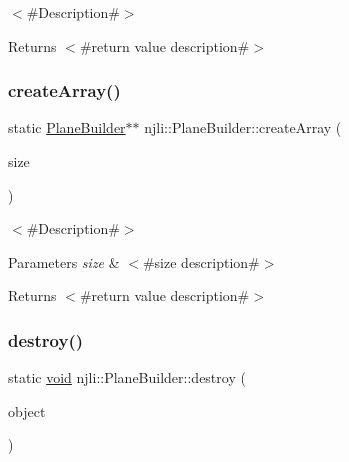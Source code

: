 $<$\#\+Description\#$>$

\begin{DoxyReturn}{Returns}
$<$\#return value description\#$>$ 
\end{DoxyReturn}
\mbox{\label{classnjli_1_1_plane_builder_a8ccda78e11dc743eac59119d6447f629}} 
\subsubsection{\texorpdfstring{create\+Array()}{createArray()}}
{\footnotesize\ttfamily static \mbox{\hyperlink{classnjli_1_1_plane_builder}{Plane\+Builder}}$\ast$$\ast$ njli\+::\+Plane\+Builder\+::create\+Array (\begin{DoxyParamCaption}\item[{const \mbox{\hyperlink{_util_8h_a10e94b422ef0c20dcdec20d31a1f5049}{u32}}}]{size }\end{DoxyParamCaption})\hspace{0.3cm}{\ttfamily [static]}}

$<$\#\+Description\#$>$


\begin{DoxyParams}{Parameters}
{\em size} & $<$\#size description\#$>$\\
\hline
\end{DoxyParams}
\begin{DoxyReturn}{Returns}
$<$\#return value description\#$>$ 
\end{DoxyReturn}
\mbox{\label{classnjli_1_1_plane_builder_a07ea1c08008e7734b4c99a60634c5c20}} 
\subsubsection{\texorpdfstring{destroy()}{destroy()}}
{\footnotesize\ttfamily static \mbox{\hyperlink{_thread_8h_af1e856da2e658414cb2456cb6f7ebc66}{void}} njli\+::\+Plane\+Builder\+::destroy (\begin{DoxyParamCaption}\item[{\mbox{\hyperlink{classnjli_1_1_plane_builder}{Plane\+Builder}} $\ast$}]{object }\end{DoxyParamCaption})\hspace{0.3cm}{\ttfamily [static]}}

